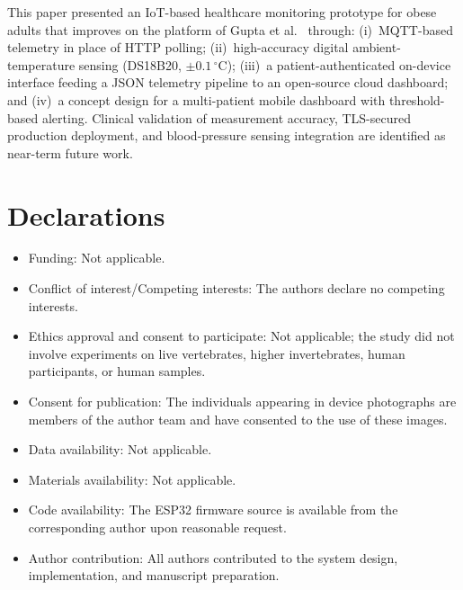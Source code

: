 \documentclass[pdflatex,sn-mathphys-num]{sn-jnl}
\begin{document}
This paper presented an IoT-based healthcare monitoring prototype for
obese adults that improves on the platform of Gupta et
al.~\cite{gupta2020} through: (i)~MQTT-based telemetry in place of
HTTP polling; (ii)~high-accuracy digital ambient-temperature
sensing (DS18B20, $\pm0.1\,^\circ$C); (iii)~a patient-authenticated
on-device interface feeding a JSON telemetry pipeline to an
open-source cloud dashboard; and (iv)~a concept design for a
multi-patient mobile dashboard with threshold-based alerting. Clinical
validation of measurement accuracy, TLS-secured production deployment,
and blood-pressure sensing integration are identified as near-term
future work.

\backmatter

\section*{Declarations}

\begin{itemize}
\footnotesize
\item Funding: Not applicable.
\item Conflict of interest/Competing interests: The authors declare
  no competing interests.
\item Ethics approval and consent to participate: Not applicable;
  the study did not involve experiments on live vertebrates, higher
  invertebrates, human participants, or human samples.
\item Consent for publication: The individuals appearing in device
  photographs are members of the author team and have consented to
  the use of these images.
\item Data availability: Not applicable.
\item Materials availability: Not applicable.
\item Code availability: The ESP32 firmware source is available from
  the corresponding author upon reasonable request.
\item Author contribution: All authors contributed to the system
  design, implementation, and manuscript preparation.
\end{itemize}
\end{document}
